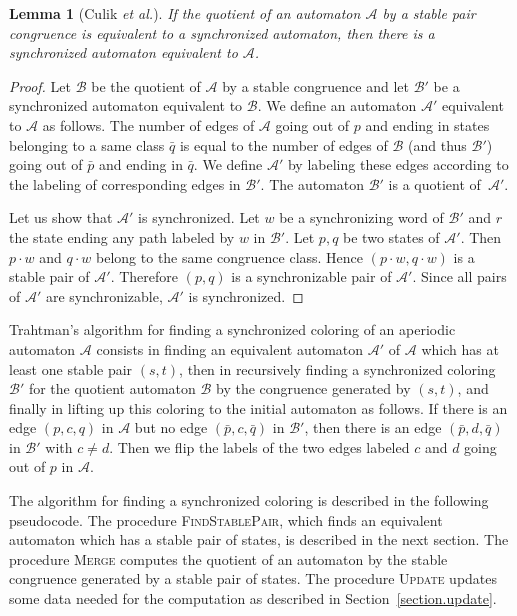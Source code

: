 \documentclass[11pt,a4paper]{article}
\newtheorem{lemma}[theorem]{Lemma}
\def\A{\mathcal{A}}
\def\B{\mathcal{B}}
\newcommand{\etal}{{\itshape et al.}\xspace }
\begin{document}
\begin{lemma}[Culik \etal \cite{CulikEtAl02}] \label{lemma.lift} If
  the quotient of an automaton $\A$ by a stable pair congruence
  is equivalent to a synchronized automaton, then there is a
  synchronized automaton equivalent to $\A$.
\end{lemma}

\begin{proof}
  Let $\B$ be the quotient of $\A$ by a stable congruence and let
  $\B'$ be a synchronized automaton equivalent to $\B$.  We define an
  automaton $\A'$ equivalent to $\A$ as follows. The number of edges
  of $\A$ going out of $p$ and ending in states belonging to a same
  class $\bar{q}$ is equal to the number of edges of $\B$ (and thus
  $\B'$) going out of $\bar{p}$ and ending in $\bar{q}$. We define
  $\A'$ by labeling these edges according to the labeling of
  corresponding edges in $\B'$. The automaton $\B'$ is a quotient
  of~$\A'$.
 


  Let us show that $\A'$ is synchronized. Let $w$ be a synchronizing
  word of $\B'$ and $r$ the state ending any path labeled by $w$ in
  $\B'$. Let $p,q$ be two states of $\A'$.  Then $p \cdot w$ and $q
  \cdot w$ belong to the same congruence class. Hence $(p \cdot w, q
  \cdot w)$ is a stable pair of $\A'$. Therefore $(p,q)$ is a
  synchronizable pair of $\A'$. Since all pairs of $\A'$ are
  synchronizable, $\A'$ is synchronized.
\end{proof}

Trahtman's algorithm for finding a synchronized coloring of an
aperiodic automaton $\A$ consists in finding an equivalent automaton
$\A'$ of $\A$ which has at least one stable pair $(s,t)$, then in
recursively finding a synchronized coloring $\B'$ for the quotient
automaton $\B$ by the congruence generated by $(s,t)$, and finally in
lifting up this coloring to the initial automaton as follows. If there
is an edge $(p,c,q)$ in $\A$ but no edge $(\bar{p},c,\bar{q})$
in $\B'$, then there is an edge $(\bar{p},d,\bar{q})$ in $\B'$ with
$c\neq d$. Then we flip the labels of the two edges labeled $c$
and $d$ going out of $p$ in $\A$.

The algorithm for finding a synchronized coloring is described in the
following pseudocode.  The procedure \textsc{FindStablePair}, which
finds an equivalent automaton which has a stable pair of states, is
described in the next section. The procedure \textsc{Merge} computes
the quotient of an automaton by the stable congruence generated by a
stable pair of states.  The procedure \textsc{Update} updates some
data needed for the computation as described in
Section~\ref{section.update}.
\end{document}
